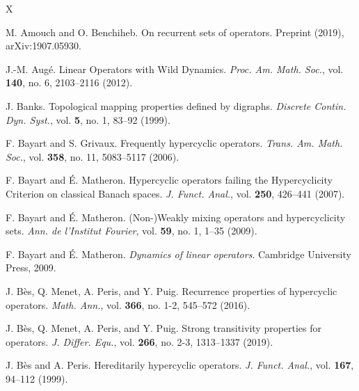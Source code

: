 \documentclass[openright,11pt]{article}
\theoremstyle{plain}
\theoremstyle{definition}
\begin{document}
{\footnotesize
\begin{thebibliography}{X}
	
	 M. Amouch and O. Benchiheb. On recurrent sets of operators. Preprint (2019), arXiv:1907.05930.%
	
	 J.-M. Aug\'e. Linear Operators with Wild Dynamics. \textit{Proc. Am. Math. Soc.}, vol. \textbf{140}, no. 6, 2103--2116 (2012).%
	
	 J. Banks. Topological mapping properties defined by digraphs. \textit{Discrete Contin. Dyn. Syst.}, vol. \textbf{5}, no. 1, 83--92 (1999).%
	
	 F. Bayart and S. Grivaux. Frequently hypercyclic operators. \textit{Trans. Am. Math. Soc.}, vol. \textbf{358}, no. 11, 5083--5117 (2006).%

	 F. Bayart and \'E. Matheron. Hypercyclic operators failing the Hypercyclicity Criterion on classical Banach spaces. \textit{J. Funct. Anal.}, vol. \textbf{250}, 426--441 (2007).%

	 F. Bayart and \'E. Matheron. (Non-)Weakly mixing operators and hypercyclicity sets. \textit{Ann. de l'Institut Fourier}, vol. \textbf{59}, no. 1, 1--35 (2009).%
	
	 F. Bayart and \'E. Matheron. \textit{Dynamics of linear operators}. Cambridge University Press, 2009.%
	
	 J. B\`es, Q. Menet, A. Peris, and Y. Puig. Recurrence properties of hypercyclic operators. \textit{Math. Ann.}, vol. \textbf{366}, no. 1-2, 545--572 (2016).%
	
	 J. B\`es, Q. Menet, A. Peris, and Y. Puig. Strong transitivity properties for operators. \textit{J. Differ. Equ.}, vol. \textbf{266}, no. 2-3, 1313--1337 (2019).%
	
	 J. B\`es and A. Peris. Hereditarily hypercyclic operators. \textit{J. Funct. Anal.}, vol. \textbf{167}, 94--112 (1999).%
	

\end{thebibliography}}
\end{document}
